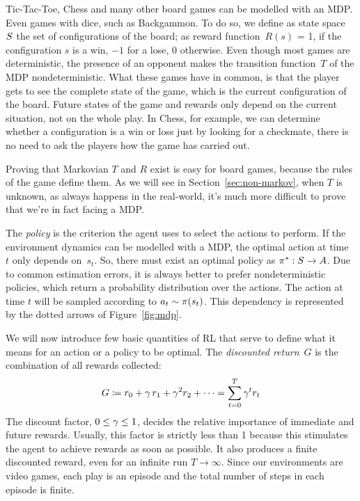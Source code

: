 \begin{example}
	\label{ex:board-games}
	Tic-Tac-Toe, Chess and many other board games can be modelled with an MDP.
	Even games with dice, such as Backgammon. To do so, we define as state
	space~$S$ the set of configurations of the board; as reward
	function~$R(s)$ = 1, if the configuration $s$ is a win, $-1$ for a lose, 0
	otherwise. Even though most games are deterministic, the presence of an
	opponent makes the transition function~$T$ of the MDP nondeterministic.
	What these games have in common, is that the player gets to see the complete
	state of the game, which is the current configuration of the board. Future
	states of the game and rewards only depend on the current situation, not on
	the whole play. In Chess, for example, we can determine whether a
	configuration is a win or loss just by looking for a checkmate, there is no
	need to ask the players how the game has carried out.

	Proving that Markovian $T$ and $R$ exist is easy for board games, because
	the rules of the game define them. As we will see in
	Section~\ref{sec:non-markov}, when $T$ is unknown, as always happens in the
	real-world, it's much more difficult to prove that we're in fact facing a
	MDP.
\end{example}

The \emph{policy} is the criterion the agent uses to select the actions to
perform. If the environment dynamics can be modelled with a MDP, the
optimal action at time~$t$ only depends on~$s_{t}$. So, there must exist
an optimal policy as $\pi^*: S \to A$. Due to common estimation
errors, it is always better to prefer nondeterministic policies, which return
a probability distribution over the actions. The action at time $t$ will be
sampled according to $a_t \sim \pi(s_t)$. This dependency is represented
by the dotted arrows of Figure~\ref{fig:mdp}.

We will now introduce few basic quantities of RL that serve to define what it
means for an action or a policy to be optimal. The \emph{discounted
return}~$G$ is the combination of all rewards collected:
\begin{equation}
	G \coloneqq r_{0} + \gamma\, r_1 + \gamma^2 r_2 + \dots =
	\sum_{t=0}^{T} \gamma^{t} r_{t}
	\label{eq:return}
\end{equation}
The discount factor, $0 \le \gamma \le 1$, decides the relative importance
of immediate and future rewards. Usually, this factor is strictly less than 1
because this stimulates the agent to achieve rewards as soon as possible.
It also produces a finite discounted reward, even for an infinite run $T \to
\infty$.  Since our environments are video games, each play is an episode and
the total number of steps in each episode is finite.

